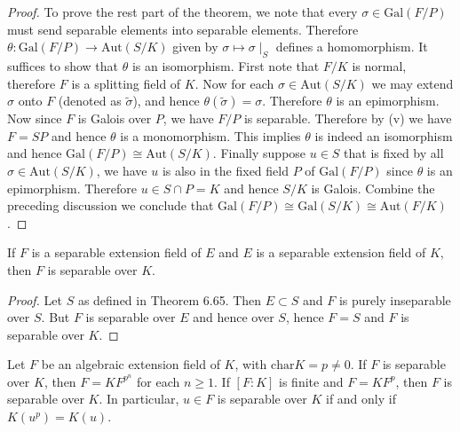 \begin{proof}
To prove the rest part of the theorem, we note that every $\sigma\in\mathrm{Gal}(F/P)$ must send separable elements into separable elements. Therefore $\theta:\mathrm{Gal}(F/P)\to\mathrm{Aut}(S/K)$ given by $\sigma\mapsto\sigma\mid_S$ defines a homomorphism. It suffices to show that $\theta$ is an isomorphism. First note that $F/K$ is normal, therefore $F$ is a splitting field of $K$. Now for each $\sigma\in\mathrm{Aut}(S/K)$ we may extend $\sigma$ onto $F$ (denoted as $\widetilde{\sigma}$), and hence $\theta(\widetilde{\sigma})=\sigma$. Therefore $\theta$ is an epimorphism. Now since $F$ is Galois over $P$, we have $F/P$ is separable. Therefore by (v) we have $F=SP$ and hence $\theta$ is a monomorphism. This implies $\theta$ is indeed an isomorphism and hence $\mathrm{Gal}(F/P)\cong\mathrm{Aut}(S/K)$. Finally suppose $u\in S$ that is fixed by all $\sigma\in\mathrm{Aut}(S/K)$, we have $u$ is also in the fixed field $P$ of $\mathrm{Gal}(F/P)$ since $\theta$ is an epimorphism. Therefore $u\in S\cap P=K$ and hence $S/K$ is Galois. Combine the preceding discussion we conclude that $\mathrm{Gal}(F/P)\cong\mathrm{Gal}(S/K)\cong\mathrm{Aut}(F/K)$.
\end{proof}
\begin{corollary}
If $F$ is a separable extension field of $E$ and $E$ is a separable extension field of $K$, then $F$ is separable over $K$.
\end{corollary}
\begin{proof}
Let $S$ as defined in Theorem 6.65. Then $E\subset S$ and $F$ is purely inseparable over $S$. But $F$ is separable over $E$ and hence over $S$, hence $F=S$ and $F$ is separable over $K$.
\end{proof}
\begin{corollary}
Let $F$ be an algebraic extension field of $K$, with $\mathrm{char}K=p\ne 0$. If $F$ is separable over $K$, then $F=KF^{p^n}$ for each $n\ge 1$. If $[F:K]$ is finite and $F=KF^p$, then $F$ is separable over $K$. In particular, $u\in F$ is separable over $K$ if and only if $K(u^p)=K(u)$.
\end{corollary}

